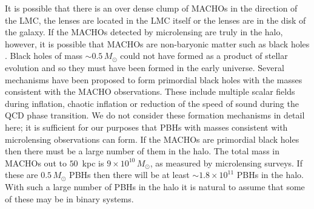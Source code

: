 It is possible that there is an over dense clump of MACHOs in the direction of
the LMC\cite{1996ApJ...473L..99N}, the lenses are located in the LMC
itself\cite{Salati:1999gd} or the lenses are in the disk of the
galaxy\cite{Evans:1997hq}.  If the MACHOs detected by microlensing are truly
in the halo, however, it is possible that MACHOs are non-baryonic matter such
as black holes \cite{Finn:1996dd,Nakamura:1997sm}. Black holes of mass $\sim
0.5\,M_\odot$ could not have formed as a product of stellar evolution and so
they must have been formed in the early
universe\cite{1967SvA....10..602Z,1974MNRAS.168..399C}.  Several mechanisms
have been proposed to form primordial black holes with the masses consistent
with the MACHO observations. These include multiple scalar fields during
inflation\cite{Yokoyama:1995ex}, chaotic inflation\cite{Yokoyama:1999xi} or
reduction of the speed of sound during the QCD phase
transition\cite{Jedamzik:1996mr}. We do not consider these formation
mechanisms in detail here; it is sufficient for our purposes that PBHs with masses
consistent with microlensing observations can form.  If the MACHOs are
primordial black holes then there must be a large number of them in the halo.
The total mass in MACHOs out to $50$~kpc is $9\times 10^{10}\,M_\odot$, as
measured by microlensing surveys. If these are $0.5\,M_\odot$ PBHs then there
will be at least $\sim 1.8 \times 10^{11}$ PBHs in the halo. With such a large
number of PBHs in the halo it is natural to assume that some of these may be
in binary systems.

